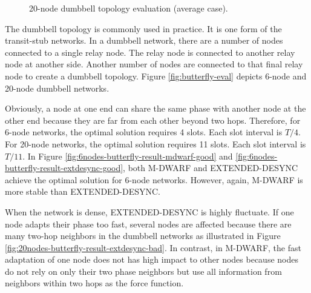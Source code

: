 \begin{figure}[!t]
{	
}
\caption{20-node dumbbell topology evaluation (average case).}
\label{fig:20nodes-butterfly-result-good}
\lofcont
\end{figure}
The dumbbell topology is commonly used in practice. It is one form of the transit-stub networks. In a dumbbell network, there are a number of nodes connected to a single relay node. The relay node is connected to another relay node at another side. Another number of nodes are connected to that final relay node to create a dumbbell topology. Figure \ref{fig:butterfly-eval} depicts 6-node and 20-node dumbbell networks.

Obviously, a node at one end can share the same phase with another node at the other end because they are far from each other beyond two hops. Therefore, for 6-node networks, the optimal solution requires 4 slots. Each slot interval is $T/4$. For 20-node networks, the optimal solution requires 11 slots. Each slot interval is $T/11$.
In Figure \ref{fig:6nodes-butterfly-result-mdwarf-good} and \ref{fig:6nodes-butterfly-result-extdesync-good}, both M-DWARF and EXTENDED-DESYNC achieve the optimal solution for 6-node networks. However, again, M-DWARF is more stable than EXTENDED-DESYNC.

When the network is dense, EXTENDED-DESYNC is highly fluctuate. If one node adapts their phase too fast, several nodes are affected because there are many two-hop neighbors in the dumbbell networks as illustrated in Figure \ref{fig:20nodes-butterfly-result-extdesync-bad}.  In contrast, in M-DWARF, the fast adaptation of one node does not has high impact to other nodes because nodes do not rely on only their two phase neighbors but use all information from neighbors within two hops as the force function.

